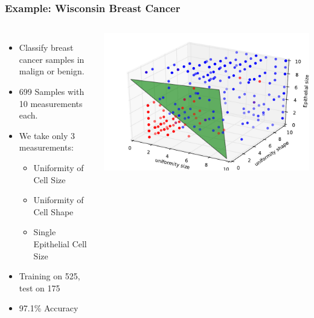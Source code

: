 \begin{frame}
    \frametitle{Example: Wisconsin Breast Cancer}
    \begin{columns}
            \begin{itemize}
                \item Classify breast cancer samples in malign or benign.
                \item 699 Samples with 10 measurements each.
                \item We take only 3 measurements:
                    \begin{itemize}
                        \item Uniformity of Cell Size
                        \item Uniformity of Cell Shape
                        \item Single Epithelial Cell Size
                    \end{itemize}
                \item Training on 525, test on 175
                \item 97.1\% Accuracy
            \end{itemize}
            \includegraphics[width=1\linewidth]{logreg-pics/wisconsin_surface}
    \end{columns}

\end{frame}

